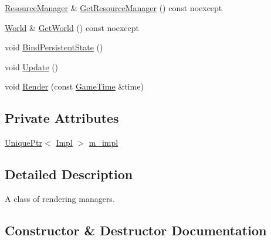 \begin{DoxyCompactItemize}
\item 
\mbox{\hyperlink{classmage_1_1rendering_1_1_resource_manager}{Resource\+Manager}} \& \mbox{\hyperlink{classmage_1_1rendering_1_1_manager_a9f696201405be6ebcd3805184535cefe}{Get\+Resource\+Manager}} () const noexcept
\item 
\mbox{\hyperlink{classmage_1_1rendering_1_1_world}{World}} \& \mbox{\hyperlink{classmage_1_1rendering_1_1_manager_a526b7c2db1a219e9b3bd4286e039696d}{Get\+World}} () const noexcept
\item 
void \mbox{\hyperlink{classmage_1_1rendering_1_1_manager_ac46b7739c7005b5a7248642ffc8299d7}{Bind\+Persistent\+State}} ()
\item 
void \mbox{\hyperlink{classmage_1_1rendering_1_1_manager_a878849c66920ccef910b31c80b1f033c}{Update}} ()
\item 
void \mbox{\hyperlink{classmage_1_1rendering_1_1_manager_af6807d464e6496c342a9cf451e70d141}{Render}} (const \mbox{\hyperlink{classmage_1_1_game_time}{Game\+Time}} \&time)
\end{DoxyCompactItemize}
\subsection*{Private Attributes}
\begin{DoxyCompactItemize}
\item 
\mbox{\hyperlink{namespacemage_a3316d7143a973e37adf1110f2e80ca31}{Unique\+Ptr}}$<$ \mbox{\hyperlink{classmage_1_1rendering_1_1_manager_1_1_impl}{Impl}} $>$ \mbox{\hyperlink{classmage_1_1rendering_1_1_manager_a1fa26fd6393941f4ef9b6863f317cd29}{m\+\_\+impl}}
\end{DoxyCompactItemize}


\subsection{Detailed Description}
A class of rendering managers. 

\subsection{Constructor \& Destructor Documentation}
\mbox{\label{classmage_1_1rendering_1_1_manager_acf71efbc73317b319be41682505695f1}} 

